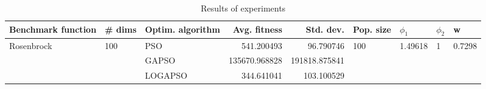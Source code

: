 \begin{table}
\centering
\caption{Results of experiments}
\begin{tabular}{lllrrllll}
\toprule
         Benchmark function &              \# dims & Optim. algorithm &  Avg. fitness &     Std. dev. &            Pop. size &               $\phi_{1}$ &         $\phi_{2}$ &                       w \\
\midrule
\multirow{3}{*}{Rosenbrock} & \multirow{3}{*}{100} &              PSO &    541.200493 &     96.790746 & \multirow{3}{*}{100} & \multirow{3}{*}{1.49618} & \multirow{3}{*}{1} & \multirow{3}{*}{0.7298} \\
                            &                      &            GAPSO & 135670.968828 & 191818.875841 &                      &                          &                    &                         \\
                            &                      &          LOGAPSO &    344.641041 &    103.100529 &                      &                          &                    &                         \\
\bottomrule
\end{tabular}
\end{table}
